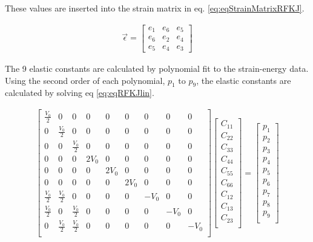 These values are inserted into the strain matrix in eq. \ref{eq:eqStrainMatrixRFKJ}.

\begin{equation}
\begin{split}
\vec{\epsilon} = \begin{bmatrix} e_1 & e_6 & e_5 \\ e_6 & e_2 & e_4 \\ e_5 & e_4 & e_3 \end{bmatrix}
\end{split}
\label{eq:eqStrainMatrixRFKJ}
\end{equation}

The 9 elastic constants are calculated by polynomial fit to the strain-energy data.  Using the second order of each polynomial, $p_1 \text{ to } p_9$, the elastic constants are calculated by solving eq \ref{eq:eqRFKJlin}. 

\begin{equation}
\begin{split}
	\begin{bmatrix} 
   \frac{V_0}{2} & 0 & 0 & 0 & 0 & 0 & 0 & 0 & 0 \\ 
   0 & \frac{V_0}{2} & 0 & 0 & 0 & 0 & 0 & 0 & 0 \\ 
   0 & 0 & \frac{V_0}{2} & 0 & 0 & 0 & 0 & 0 & 0 \\ 
   0 & 0 & 0 & 2V_0 & 0 & 0 & 0 & 0 & 0 \\ 
   0 & 0 & 0 & 0 & 2V_0 & 0 & 0 & 0 & 0 \\ 
   0 & 0 & 0 & 0 & 0 & 2V_0 & 0 & 0 & 0 \\ 
   \frac{V_0}{2} & \frac{V_0}{2} & 0 & 0 & 0 & 0 & -V_0 & 0 & 0 \\ 
   \frac{V_0}{2} & 0 & \frac{V_0}{2} & 0 & 0 & 0 & 0 & -V_0 & 0 \\ 
   0 & \frac{V_0}{2} & \frac{V_0}{2} & 0 & 0 & 0 & 0 & 0 & -V_0 \\ 
\end{bmatrix} 
\begin{bmatrix} 
C_{11} \\ 
C_{22} \\ 
C_{33} \\ 
C_{44} \\ 
C_{55} \\ 
C_{66} \\ 
C_{12} \\ 
C_{13} \\ 
C_{23} \\  
\end{bmatrix} = 
\begin{bmatrix} 
p_{1} \\ 
p_{2} \\ 
p_{3} \\ 
p_{4} \\ 
p_{5} \\ 
p_{6} \\ 
p_{7} \\ 
p_{8} \\ 
p_{9} \\  
\end{bmatrix}
\end{split}
\label{eq:eqRFKJlin}
\end{equation}



